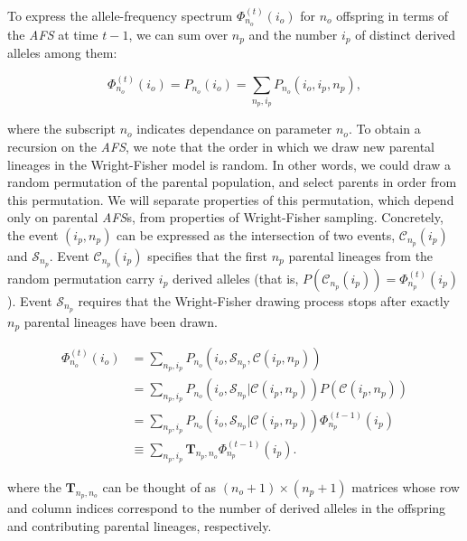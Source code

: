\documentclass[review]{elsarticle}
\newcommand{\afs}[2]{\Phi_{#1}^{(#2)}}
\begin{document}
To express the allele-frequency spectrum $\afs{n_o}{t}(i_o)$ for $n_o$ offspring in terms of the
\textit{AFS} at time $t-1$, we can sum over $n_p$ and the number $i_p$ of distinct derived alleles among them:


\begin{equation}
\afs{n_o}{t}(i_o)=P_{n_o} (i_o) =\sum_{n_p,i_p} P_{n_o}(i_o,i_p,n_p),
\end{equation}

where the subscript $n_o$ indicates dependance on parameter $n_o$. To obtain a recursion on the
\textit{AFS}, we note that the order in which we draw new parental lineages in the Wright-Fisher
model is random. In other words, we could draw a random permutation of the parental population, and
select parents in order from this permutation. We will separate properties of this permutation,
which depend only on parental \textit{AFS}s, from properties of Wright-Fisher sampling. Concretely,
the event $(i_p,n_p)$ can be expressed as the intersection of two events, $\mathcal{C}_{n_p}(i_p)$
and $\mathcal{S}_{n_p}$. Event $\mathcal{C}_{n_p}(i_p)$ specifies that the first $n_p$ parental
lineages from the random permutation carry $i_p$ derived alleles (that is,
$P(\mathcal{C}_{n_p}(i_p)) =\afs{n_p}{t} (i_p)$). Event $\mathcal{S}_{n_p}$ requires that the
Wright-Fisher drawing process stops after exactly $n_p$ parental lineages have been drawn.

\begin{equation}
\begin{split}
\afs{n_o}{t}(i_o)&= \sum_{n_p,i_p} P_{n_o}(i_o, \mathcal{S}_{n_p}, \mathcal{C}(i_p,n_p) )\\
&=   \sum_{n_p,i_p} P_{n_o}(i_o, \mathcal{S}_{n_p}| \mathcal{C}(i_p,n_p) ) P(\mathcal{C}(i_p,n_p))\\
&=   \sum_{n_p,i_p} P_{n_o}(i_o, \mathcal{S}_{n_p}| \mathcal{C}(i_p,n_p) )  \afs{n_p}{t-1}(i_p)\\
&\equiv  \sum_{n_p,i_p}  \mathbf{T}_{n_p,n_o}     \afs{n_p}{t-1}(i_p).
\end{split}
\label{eq:recur}
\end{equation}

where the $\mathbf{T}_{n_p,n_o}$ can be thought of as $(n_o+1) \times (n_p+1)$ matrices whose row
and column indices correspond to the number of derived alleles in the offspring and contributing
parental lineages, respectively.
\end{document}
